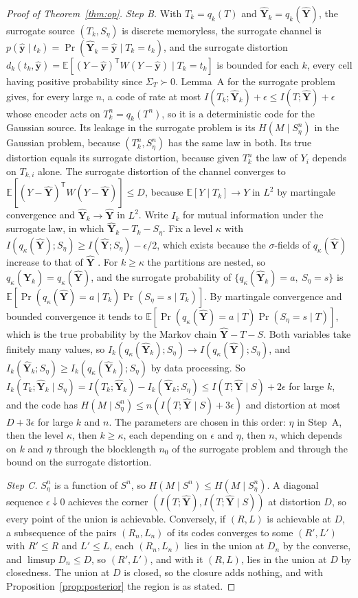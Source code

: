 \documentclass[11pt,onecolumn]{IEEEtran}
\newcommand{\E}{\mathbb{E}}
\newcommand{\hY}{\hat{\mathbf Y}}
\newcommand{\hy}{\hat{\mathbf y}}
\begin{document}
\begin{proof}[Proof of Theorem~\ref{thm:op}]
\emph{Step B.} With $T_k=q_k(T)$ and $\hY_k=q_k(\hY)$, the surrogate
source $(T_k,S_\eta)$ is discrete memoryless, the surrogate channel is
$p(\hy\mid t_k)=\Pr(\hY_k=\hy\mid T_k=t_k)$, and the surrogate distortion
$d_k(t_k,\hy)=\E[(Y-\hy)^{\mathsf T}W(Y-\hy)\mid T_k=t_k]$ is bounded for
each $k$, every cell having positive probability since
$\Sigma_T\succ0$. Lemma~A for the surrogate problem
gives, for every large $n$, a code of rate at most
$I(T_k;\hY_k)+\epsilon\le I(T;\hY)+\epsilon$ whose encoder acts on
$T_k^n=q_k(T^n)$, so it is a deterministic code for the Gaussian source.
Its leakage in the surrogate problem is its $H(M\mid S_\eta^n)$ in the
Gaussian problem, because $(T_k^n,S_\eta^n)$ has the same law in both.
Its true distortion equals
its surrogate distortion, because given $T_k^n$ the law of $Y_i$ depends
on $T_{k,i}$ alone. The surrogate distortion of the channel converges to
$\E[(Y-\hY)^{\mathsf T}W(Y-\hY)]\le D$, because $\E[Y\mid T_k]\to Y$ in
$L^2$ by martingale convergence and $\hY_k\to\hY$ in $L^2$. Write $I_k$ for
mutual information under the surrogate law, in which
$\hY_k-T_k-S_\eta$. Fix a level $\kappa$ with
$I(q_\kappa(\hY);S_\eta)\ge I(\hY;S_\eta)-\epsilon/2$, which exists because
the $\sigma$-fields of $q_\kappa(\hY)$ increase to that of $\hY$
\cite[Ch.~2]{pinsker1964}. For $k\ge\kappa$ the partitions are nested, so
$q_\kappa(\hY_k)=q_\kappa(\hY)$, and the surrogate probability of
$\{q_\kappa(\hY_k)=a,\ S_\eta=s\}$ is
$\E[\Pr(q_\kappa(\hY)=a\mid T_k)\Pr(S_\eta=s\mid T_k)]$. By martingale
convergence and bounded convergence it tends to
$\E[\Pr(q_\kappa(\hY)=a\mid T)\Pr(S_\eta=s\mid T)]$, which is the true
probability by the Markov chain $\hY-T-S$. Both variables take finitely
many values, so $I_k(q_\kappa(\hY_k);S_\eta)\to I(q_\kappa(\hY);S_\eta)$, and
$I_k(\hY_k;S_\eta)\ge I_k(q_\kappa(\hY_k);S_\eta)$ by data processing. So
$I_k(T_k;\hY_k\mid S_\eta)=I(T_k;\hY_k)-I_k(\hY_k;S_\eta)\le I(T;\hY\mid S)+2\epsilon$
for large $k$, and the code has
$H(M\mid S_\eta^n)\le n(I(T;\hY\mid S)+3\epsilon)$ and distortion at most
$D+3\epsilon$ for large $k$ and $n$. The parameters are chosen in this
order: $\eta$ in Step~A, then the level $\kappa$, then $k\ge\kappa$,
each depending on $\epsilon$ and $\eta$, then $n$, which depends on $k$ and $\eta$ through the
blocklength $n_0$ of the surrogate problem and through the bound on the
surrogate distortion.

\emph{Step C.} $S_\eta^n$ is a function of $S^n$, so
$H(M\mid S^n)\le H(M\mid S_\eta^n)$. A diagonal sequence
$\epsilon\downarrow0$ achieves the corner
$(I(T;\hY),I(T;\hY\mid S))$ at distortion $D$, so every point of the
union is achievable. Conversely, if $(R,L)$ is achievable at $D$, a
subsequence of the pairs $(R_n,L_n)$ of its codes converges to some
$(R',L')$ with $R'\le R$ and $L'\le L$, each $(R_n,L_n)$ lies in the union
at $D_n$ by the converse, and $\limsup D_n\le D$, so $(R',L')$, and with
it $(R,L)$, lies in the union at $D$ by closedness. The union at $D$ is
closed, so the closure adds nothing, and with
Proposition~\ref{prop:posterior} the region is as stated.
\end{proof}
\end{document}
